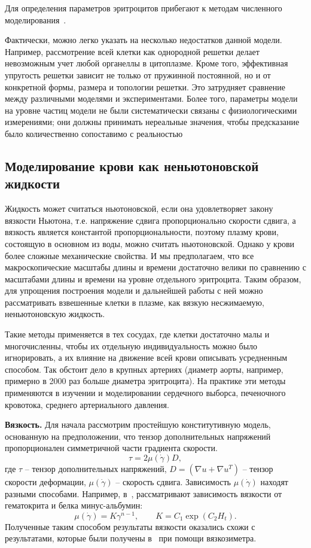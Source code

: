Для определения параметров эритроцитов прибегают к методам численного моделирования~\cite{bessonov:2014}.

Фактически, можно легко указать на несколько недостатков данной модели. Например, рассмотрение всей клетки как однородной решетки 
делает невозможным учет любой органеллы в цитоплазме. Кроме того, эффективная упругость решетки зависит не только от 
пружинной постоянной, но и от конкретной формы, размера и топологии решетки. Это затрудняет сравнение между различными моделями 
и экспериментами. Более того, параметры модели на уровне частиц  модели не были систематически связаны с физиологическими измерениями; 
они должны принимать нереальные значения, чтобы предсказание было количественно сопоставимо с реальностью 


\subsection{Моделирование крови как неньютоновской жидкости}
Жидкость может считаться ньютоновской, если она удовлетворяет закону вязкости Ньютона, 
т.е. напряжение сдвига пропорционально скорости сдвига, а вязкость является константой пропорциональности, 
поэтому плазму крови, состоящую в основном из воды, можно считать ньютоновской. Однако у крови более сложные механические свойства. 
И мы предполагаем, что все макроскопические масштабы длины и времени достаточно велики по сравнению с масштабами длины и времени 
на уровне отдельного эритроцита. Таким образом, для упрощения построения модели и дальнейшей работы с ней можно рассматривать 
взвешенные клетки в плазме, как вязкую несжимаемую, неньютоновскую жидкость.

Такие методы применяется в тех сосудах, где клетки достаточно малы и многочисленны, чтобы их отдельную индивидуальность можно было
игнорировать, а их влияние на движение всей крови описывать усредненным способом. 
Так обстоит дело в крупных артериях (диаметр аорты, например, примерно в 2000 раз больше диаметра эритроцита). 
На практике эти методы применяются в изучении и моделировании сердечного выборса, печеночного кровотока, среднего артериального давления.

\textbf{Вязкость.}
Для начала рассмотрим простейшую конститутивную модель, основанную на предположении, что тензор дополнительных напряжений пропорционален
симметричной части градиента скорости.
$$
\tau=2\mu (\dot{\gamma})D,
$$
где $\tau $ -- тензор дополнительных напряжений, $D=(\nabla u+\nabla u^T)$ -- тензор скорости деформации, 
$\mu (\dot{\gamma})$ -- скорость сдвига.
Зависимость $\mu (\dot{\gamma})$ находят разными способами. Например, в~\cite{walburn:1976}, 
рассматривают зависимость вязкости от гематокрита и белка минус-альбумин: \\
$$
\mu (\dot{\gamma})=K{\gamma}^{n-1}, \qquad  K=C_1 \exp (C_2 H_t).
$$
Полученные таким способом результаты вязкости оказались схожи с результатами, которые были получены в~\cite{kim:2000} при помощи вязкозиметра.\\


